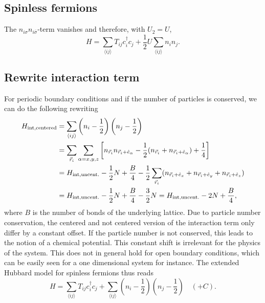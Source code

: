 \documentclass[../../main.tex]{subfiles}
\begin{document}
\subsection*{Spinless fermions}

The $n_{i\sigma}n_{i\bar\sigma}$-term vanishes and therefore, with $U_2=U$,
\begin{equation}
H=
\sum_{\langle ij\rangle}T_{ij}c_i^\dagger c_j
+\frac12 U\sum_{\langle ij\rangle}n_i n_j.
\label{eq:passetti2022-spinless}
\end{equation}

\subsection*{Rewrite interaction term}
For periodic boundary conditions and if the number of particles is conserved, we can do the following rewriting
\begin{align}
H_{\text{int,centered}} &= \sum_{\langle ij\rangle}\left(n_i-\frac12\right)\left(n_j-\frac12\right) \\
&=\sum_{\vec r_i} \sum_{\alpha=x,y,z}
\left[n_{\vec r_i} n_{\vec r_i + \hat e_\alpha}
-\frac12(n_{\vec r_i} + n_{\vec r_i + \hat e_\alpha})+\frac14\right]
\notag\\
&=H_{\text{int,uncent.}}
- \frac12 N +\frac B4 - \frac12 \sum_{\vec r_i} (n_{\vec r_i + \hat e_x} + n_{\vec r_i + \hat e_y} +n_{\vec r_i + \hat e_z} ) 
\notag\\
&=H_{\text{int,uncent.}}
- \frac12 N +\frac B4 - \frac32 N =H_{\text{int,uncent.}}
- 2 N +\frac B4,
\notag\\
\label{eq:passetti2022-centering}
\end{align}
where $B$ is the number of bonds of the underlying lattice. Due to particle number conservation, the centered and not centered version of the interaction term only differ by a constant offset. If the particle number is not conserved, this leads to the notion of a chemical potential. This constant shift is irrelevant for the physics of the system. This does not in general hold for open boundary conditions, which can be easily seen for a one dimensional system for instance. The extended Hubbard model for spinless fermions thus reads
\begin{equation}
H=
\sum_{\langle ij\rangle}T_{ij}c_i^\dagger c_j
+\sum_{\langle ij\rangle}\left(n_i-\frac12\right)\left(n_j-\frac12\right)
\quad(+C) .
\label{eq:passetti2022-electronic-centered}
\end{equation}
\end{document}
